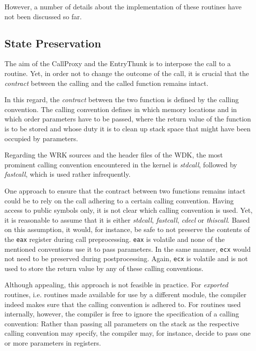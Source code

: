 However, a number of details about the implementation of these routines
have not been discussed so far.

\subsection{State Preservation}
The aim of the CallProxy and the EntryThunk is to interpose the call
to a routine. Yet, in order not to change the outcome of the call, it 
is crucial that the \emph{contract} between the calling and the called
function remains intact.

In this regard, the \emph{contract} between the two function is defined
by the calling convention. The calling convention defines in which memory
locations and in which order parameters have to be passed, where the
return value of the function is to be stored and whose duty it is to clean
up stack space that might have been occupied by parameters.

Regarding the WRK sources and the header files of the WDK, the most prominent 
calling convention encountered in the kernel is \emph{stdcall}, followed by
\emph{fastcall}, which is used rather infrequently.

One approach to ensure that the contract between two functions remains
intact could be to rely on the call adhering to a certain calling convention.
Having access to public symbols only, it is not clear which calling convention
is used. Yet, it is reasonable to assume that it is either \emph{stdcall}, 
\emph{fastcall}, \emph{cdecl} or \emph{thiscall}. Based on this assumption, 
it would, for instance, be safe to not
preserve the contents of the \verb|eax| register during call preprocessing. \verb|eax| is
volatile and none of the mentioned conventions use it to pass parameters.
In the same manner, \verb|ecx| would not need to be preserved during postprocessing.
Again, \verb|ecx| is volatile and is not used to store the return value by any
of these calling conventions.

Although appealing, this approach is not feasible in practice. For \emph{exported}
routines, i.e. routines made available for use by a different module, the compiler
indeed makes sure that the calling convention is adhered to. For routines used
internally, however, the compiler is free to ignore the specification of a calling 
convention: Rather than passing all parameters on the stack as the respective calling convention 
may specify, the compiler may, for instance, decide to pass one or more parameters 
in registers.

